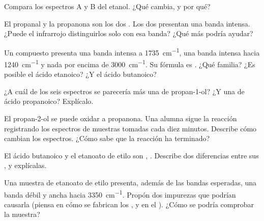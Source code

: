 \begin{exercise}[$\star\star$]\label{exo:g11:infrared:8}
Compara los espectros A y B del etanol. ¿Qué cambia, y por qué?
\end{exercise}

\begin{exercise}[$\star\star$]\label{exo:g11:infrared:9}
El propanal y la propanona son los dos . Los dos presentan una
banda  intensa. ¿Puede el infrarrojo distinguirlos solo con esa
banda? ¿Qué más podría ayudar?
\end{exercise}

\begin{exercise}[$\star\star$]\label{exo:g11:infrared:10}
Un compuesto presenta una banda intensa a \qty{1735}{cm^{-1}}, una banda
intensa hacia \qty{1240}{cm^{-1}} y nada por encima de
\qty{3000}{cm^{-1}}. Su fórmula es . ¿Qué familia? ¿Es
posible el ácido etanoico? ¿Y el ácido butanoico?
\end{exercise}

\begin{exercise}[$\star\star$]\label{exo:g11:infrared:11}
¿A cuál de los seis espectros se parecería más una  de
propan-1-ol? ¿Y una de ácido propanoico? Explícalo.
\end{exercise}

\begin{exercise}[$\star\star\star$]\label{exo:g11:infrared:12}
El propan-2-ol se puede oxidar a propanona. Una alumna sigue la reacción
registrando los espectros de muestras tomadas cada diez minutos.
Describe cómo cambian los espectros. ¿Cómo sabe que la reacción ha
terminado?
\end{exercise}

\begin{exercise}[$\star\star\star$]\label{exo:g11:infrared:13}
El ácido butanoico y el etanoato de etilo son , .
Describe dos diferencias entre sus , y explícalas.
\end{exercise}

\begin{exercise}[$\star\star\star$]\label{exo:g11:infrared:14}
Una muestra de etanoato de etilo presenta, además de las bandas
esperadas, una banda débil y ancha hacia \qty{3350}{cm^{-1}}. Propón dos
impurezas que podrían causarla (piensa en cómo se fabrican los ,
y en el ). ¿Cómo se podría comprobar la muestra?
\end{exercise}

